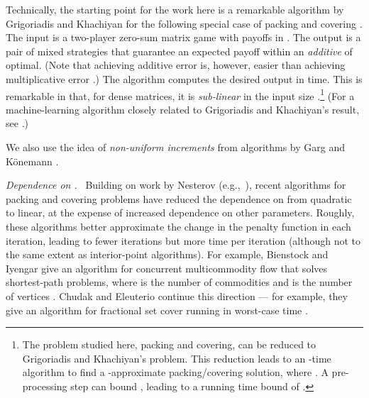 \documentclass[11pt]{svjour3} \usepackage{fullpage}
\renewcommand{\paragraph}[1]{\smallskip\vspace{2pt}\par{\em #1}~}
\begin{document}
Technically, the starting point for the work here is a remarkable algorithm by Grigoriadis and Khachiyan for the following special case of packing and covering \cite{Grigoriadis95Sublinear}.
The input is a two-player zero-sum matrix game with payoffs in .
The output is a pair of mixed strategies that guarantee an expected payoff within an {\em additive}  of optimal.   (Note that achieving additive error  is, however, easier than achieving multiplicative error .)
The algorithm computes the desired output 
in  time.
This is remarkable in that, for dense matrices, it is {\em sub-linear} in the input size .\footnote{
The problem studied here, packing and covering, can be reduced to Grigoriadis and Khachiyan's problem.  This reduction leads to an -time algorithm to find a -approximate packing/covering solution,
where .
A pre-processing step \cite[\S2.1]{Luby93Parallel} can bound ,
leading to a running time bound of .}
(For a machine-learning algorithm closely related to Grigoriadis and Khachiyan's result,
see \cite{clarkson2010sublinear,clarkson2012machine}.)

We also use the idea of {\em non-uniform increments}
from algorithms by Garg and K\"onemann
\cite{Garg98Faster,Konemann98Fast,garg2007faster}.

\paragraph{Dependence on .}
Building on work by Nesterov (e.g.,~\cite{nesterov2005smooth,nesterov2009unconstrained}),
recent algorithms for packing and covering problems
have reduced the dependence on  from quadratic to linear, 
at the expense of increased dependence on other parameters.
Roughly, these algorithms better approximate the change in the penalty function in each iteration, leading to fewer iterations but more time per iteration
(although not to the same extent as interior-point algorithms).
For example, Bienstock and Iyengar give an algorithm for concurrent multicommodity flow that solves  shortest-path problems, where  is the number of commodities and  is the number of vertices \cite{Bienstock04Solving}.  
Chudak and Eleuterio continue this direction --- for example, they give an algorithm for fractional set cover running in worst-case time  \cite{chudak2005ias}.
\end{document}
